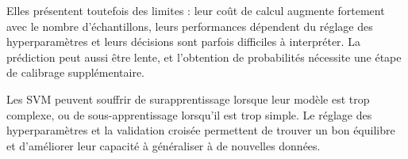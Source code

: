 \documentclass[12pt,twoside,letterpaper]{article}
\begin{document}
Elles présentent toutefois des limites : leur coût de calcul augmente fortement 
avec le nombre d'échantillons, leurs performances dépendent du réglage des 
hyperparamètres et leurs décisions sont parfois difficiles à interpréter. 
La prédiction peut aussi être lente, et l'obtention de probabilités nécessite 
une étape de calibrage supplémentaire.\newline

Les SVM peuvent souffrir de surapprentissage lorsque leur modèle est trop complexe, ou de 
sous-apprentissage lorsqu'il est trop simple. Le réglage des hyperparamètres et la validation 
croisée permettent de trouver un bon équilibre et d'améliorer leur capacité à généraliser à de 
nouvelles données.


\newpage

\end{document}
